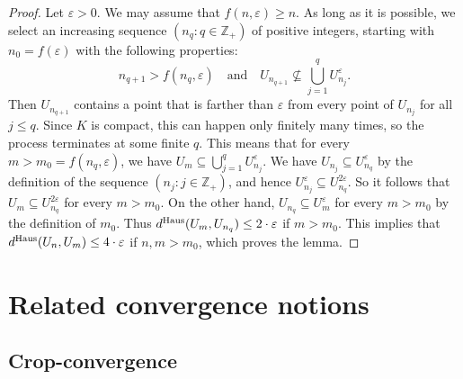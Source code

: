 \documentclass[10pt]{article}
\theoremstyle{plain}
\theoremstyle{definition}
\newcommand{\bbZ}{\mathbb{Z}}
\newcommand{\eps}{\varepsilon}
\newcommand{\Haus}{{\text{\rm Haus}}}
\begin{document}
\begin{proof}
Let $\eps>0$. We may assume that $f(n,\eps)\ge n$. As long as it is possible, we select an increasing sequence $(n_q\colon q\in\bbZ_+)$ of positive
integers, starting with $n_0=f(\eps)$ with the following properties:
\[
n_{q+1}> f(n_q,\eps) \quad \text{and}\quad U_{n_{q+1}}\not\subseteq
\bigcup_{j=1}^{q} U_{n_j}^\eps.
\]
Then $U_{n_{q+1}}$ contains a point that is farther than $\eps$ from every
point of $U_{n_j}$ for all $j\le q$. Since $K$ is compact, this can happen only finitely many times, 
so the process terminates at some finite $q$. This means that for every $m>m_0=f(n_q,\eps)$, we have $U_m\subseteq
\bigcup_{j=1}^{q} U_{n_j}^\eps$. We have $U_{n_j}\subseteq U_{n_q}^\eps$ by the
definition of the sequence $(n_j\colon j\in\bbZ_+)$, and hence $U_{n_j}^\eps\subseteq
U_{n_q}^{2\eps}$. So it follows that $U_m\subseteq U_{n_q}^{2\eps}$ for every
$m>m_0$. On the other hand, $U_{n_q}\subseteq U_m^{\eps}$ for every $m>m_0$ by
the definition of $m_0$. Thus $d^\Haus(U_m,U_{n_q})\le 2\cdot \eps$ if $m>m_0$. This
implies that $d^\Haus(U_n,U_m)\le 4\cdot \eps$ if $n,m>m_0$, which proves the lemma.
\end{proof}

\section{Related convergence notions}
\label{sec:related}
\subsection{Crop-convergence}
\label{sec:crop}
\end{document}
